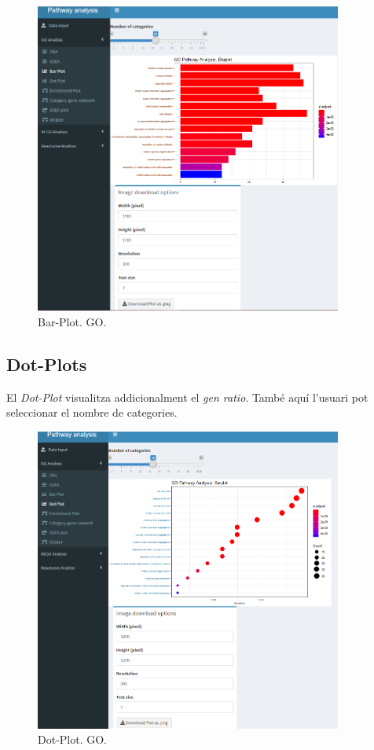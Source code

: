 \begin{figure}[H]
\centering
\includegraphics[width=0.9\textwidth]{figures/App_F14_Items_GO_BarPlot.png} 
\caption{\gls{Bar-Plot}. \gls{GO}.}
\end{figure}

\subsection{\gls{Dot-Plot}s}

El \textit{\gls{Dot-Plot}} visualitza addicionalment el \textit{gen ratio}. També aquí l'usuari pot seleccionar el nombre de categories.


\begin{figure}[H]
\centering
\includegraphics[width=0.9\textwidth]{figures/App_F15_Items_GO_DotPlot.png} 
\caption{\gls{Dot-Plot}. GO.}
\end{figure}

